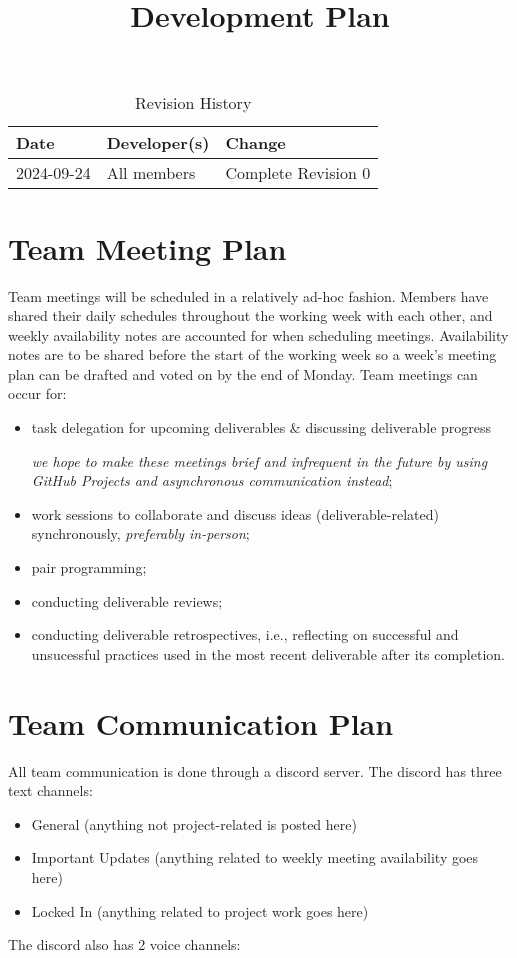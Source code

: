 \documentclass{article}
\title{Development Plan\\\progname}
\author{\authname}
\date{}
\begin{document}
\maketitle

\begin{table}[hp]
\caption{Revision History} \label{TblRevisionHistory}
\begin{tabularx}{\textwidth}{llX}
\toprule
\textbf{Date} & \textbf{Developer(s)} & \textbf{Change}\\
\midrule
2024-09-24 & All members & Complete Revision 0\\
\bottomrule
\end{tabularx}
\end{table}

\section{Team Meeting Plan}
Team meetings will be scheduled in a relatively ad-hoc fashion. Members have shared their daily schedules throughout the working week with each other, and weekly availability notes are accounted for when scheduling meetings. Availability notes are to be shared before the start of the working week so a week's meeting plan can be drafted and voted on by the end of Monday. Team meetings can occur for:
\begin{itemize}
  \item task delegation for upcoming deliverables \& discussing deliverable progress
  
  \emph{we hope to make these meetings brief and infrequent in the future by using GitHub Projects and asynchronous communication instead};
  \item work sessions to collaborate and discuss ideas (deliverable-related) synchronously, \emph{preferably in-person};
  \item pair programming;
  \item conducting deliverable reviews;
  \item conducting deliverable retrospectives, i.e., reflecting on successful and unsucessful practices used in the most recent deliverable after its completion.
\end{itemize}

\section{Team Communication Plan}
All team communication is done through a discord server. The discord has three text channels:
\begin{itemize}
  \item General (anything not project-related is posted here)
  \item Important Updates (anything related to weekly meeting availability goes here)
  \item Locked In (anything related to project work goes here)
\end{itemize}
\noindent
The discord also has 2 voice channels:
\end{document}
